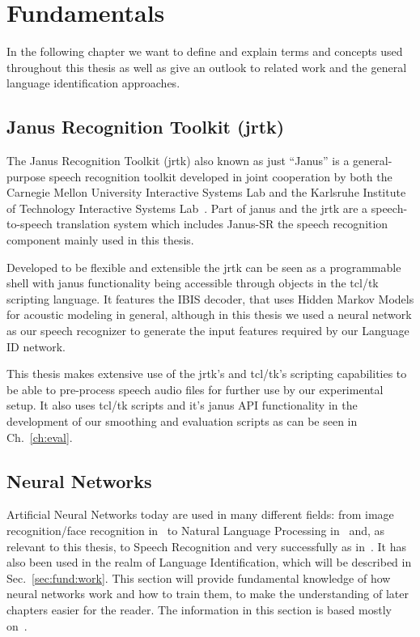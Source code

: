 

\chapter{Fundamentals}
\label{ch:fund}

In the following chapter we want to define and explain terms and concepts used throughout this thesis as well as give an outlook to related work and the general language identification approaches.

\section{Janus Recognition Toolkit (jrtk)}
\label{sec:fund:jrtk}
The Janus Recognition Toolkit (jrtk) also known as just ``Janus'' is a general-purpose speech recognition toolkit developed in joint cooperation by both the Carnegie Mellon University Interactive Systems Lab and the Karlsruhe Institute of Technology Interactive Systems Lab~\cite{lavie1997janus}. Part of janus and the jrtk are a speech-to-speech translation system which includes Janus-SR the speech recognition component mainly used in this thesis. 

Developed to be flexible and extensible the jrtk can be seen as a programmable shell with janus functionality being accessible through objects in the tcl/tk scripting language. It features the IBIS decoder, that uses Hidden Markov Models for acoustic modeling in general, although in this thesis we used a neural network as our speech recognizer to generate the input features required by our Language ID network.

This thesis makes extensive use of the jrtk's and tcl/tk's scripting capabilities to be able to pre-process speech audio files for further use by our experimental setup. It also uses tcl/tk scripts and it's janus API functionality in the development of our smoothing and evaluation scripts as can be seen in Ch.~\ref{ch:eval}.
\section{Neural Networks}
\label{sec:fund:NN}
Artificial Neural Networks today are used in many different fields: from image recognition/face recognition in~\cite{lawrence1997face} to Natural Language Processing in~\cite{collobert2008unified} and, as relevant to this thesis, to Speech Recognition and very successfully as in~\cite{hinton2012deep}. It has also been used in the realm of Language Identification, which will be described in Sec.~\ref{sec:fund:work}. This section will provide fundamental knowledge of how neural networks work and how to train them, to make the understanding of later chapters easier for the reader. The information in this section is based mostly on~\cite{haykin2004comprehensive}.

